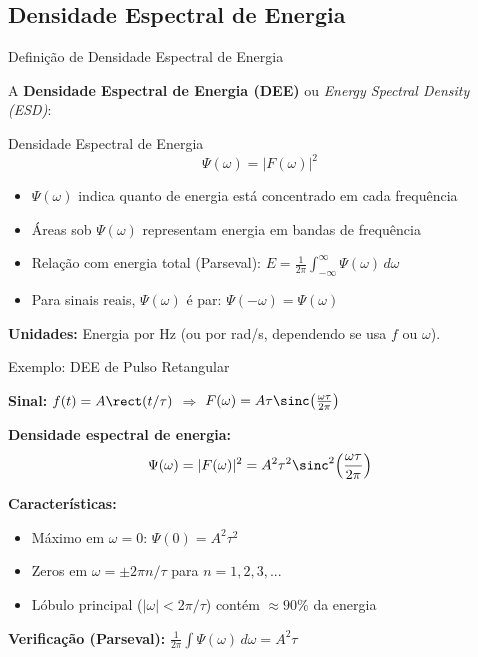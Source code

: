 
\subsection{Densidade Espectral de Energia}

\begin{frame}{Definição de Densidade Espectral de Energia}

A \textbf{Densidade Espectral de Energia (DEE)} ou \textit{Energy Spectral Density (ESD)}:

\begin{block}{Densidade Espectral de Energia}
\vspace{-2mm}
\[
\Psi(\omega) = |F(\omega)|^2
\]
\vspace{-2mm}
\end{block}

\begin{itemize}
\item $\Psi(\omega)$ indica quanto de energia está concentrado em cada frequência
\item Áreas sob $\Psi(\omega)$ representam energia em bandas de frequência
\item Relação com energia total (Parseval): $\displaystyle E = \frac{1}{2\pi} \int_{-\infty}^{\infty} \Psi(\omega)\, d\omega$
\item Para sinais reais, $\Psi(\omega)$ é par: $\Psi(-\omega) = \Psi(\omega)$
\end{itemize}

\textbf{Unidades:} Energia por Hz (ou por rad/s, dependendo se usa $f$ ou $\omega$).

\end{frame}


\begin{frame}{Exemplo: DEE de Pulso Retangular}

\textbf{Sinal:} $f(t) = A\rect(t/\tau)$ \quad $\Rightarrow$ \quad $F(\omega) = A\tau \sinc\!\left(\frac{\omega\tau}{2\pi}\right)$

\textbf{Densidade espectral de energia:}
\vspace{-2mm}
\[
\Psi(\omega) = |F(\omega)|^2 = A^2\tau^2 \sinc^2\!\left(\frac{\omega\tau}{2\pi}\right)
\]
\vspace{-2mm}

\textbf{Características:}

\begin{itemize}
\item Máximo em $\omega = 0$: $\Psi(0) = A^2\tau^2$
\item Zeros em $\omega = \pm 2\pi n/\tau$ para $n = 1, 2, 3, ...$
\item Lóbulo principal ($|\omega| < 2\pi/\tau$) contém $\approx 90\%$ da energia
\end{itemize}

\textbf{Verificação (Parseval):} $\frac{1}{2\pi}\int \Psi(\omega)\,d\omega = A^2\tau$ \checkmark

\end{frame}

